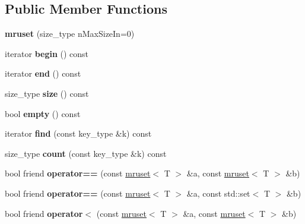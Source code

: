 \subsection*{Public Member Functions}
\begin{DoxyCompactItemize}
\item 
\mbox{\label{classmruset_a708b11a33448c283f6f4c8e18fd3098f}} 
{\bfseries mruset} (size\+\_\+type n\+Max\+Size\+In=0)
\item 
\mbox{\label{classmruset_a778f8d3dc53ce8e76abb2f88ab42b3ad}} 
iterator {\bfseries begin} () const
\item 
\mbox{\label{classmruset_ac93f008bbc701f8c9512f6f1d8ae1d24}} 
iterator {\bfseries end} () const
\item 
\mbox{\label{classmruset_a9b1cd4454d0399085c4ec9ddb8611011}} 
size\+\_\+type {\bfseries size} () const
\item 
\mbox{\label{classmruset_a94f290b3990c91c3606ab11935cee849}} 
bool {\bfseries empty} () const
\item 
\mbox{\label{classmruset_abe8cc5d73bc6efad0bdaf4fa51bcc362}} 
iterator {\bfseries find} (const key\+\_\+type \&k) const
\item 
\mbox{\label{classmruset_aff65b732aed809fb84542e1136321a24}} 
size\+\_\+type {\bfseries count} (const key\+\_\+type \&k) const
\item 
\mbox{\label{classmruset_aced009504f86176bd82426aa24a38e37}} 
bool friend {\bfseries operator==} (const \mbox{\hyperlink{classmruset}{mruset}}$<$ T $>$ \&a, const \mbox{\hyperlink{classmruset}{mruset}}$<$ T $>$ \&b)
\item 
\mbox{\label{classmruset_a4d7231441276ef8a6c0fa3edf9712f5c}} 
bool friend {\bfseries operator==} (const \mbox{\hyperlink{classmruset}{mruset}}$<$ T $>$ \&a, const std\+::set$<$ T $>$ \&b)
\item 
\mbox{\label{classmruset_a5a95239f76da8ba675ba748baf1f07c8}} 
bool friend {\bfseries operator$<$} (const \mbox{\hyperlink{classmruset}{mruset}}$<$ T $>$ \&a, const \mbox{\hyperlink{classmruset}{mruset}}$<$ T $>$ \&b)

\end{DoxyCompactItemize}
